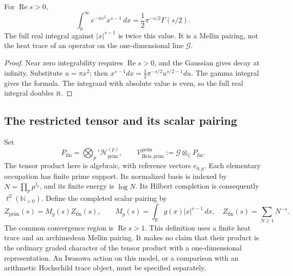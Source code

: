 \begin{proposition}
\label{v4-arith:prim-zeta:prop:arch-char}
For \(\operatorname{Re}s>0\),
\begin{equation}
\label{v4-arith:prim-zeta:eq:arch-char}
 \int_0^\infty e^{-\pi x^2}x^{s-1}\,dx
 =\frac12\pi^{-s/2}\Gamma(s/2).
\end{equation}
The full real integral against \(|x|^{s-1}\) is twice this value.
It is a Mellin pairing, not the heat trace of an operator on the
one-dimensional line \(\mathcal G\).
\end{proposition}
\begin{proof}
Near zero integrability requires \(\operatorname{Re}s>0\), and the
Gaussian gives decay at infinity. Substitute \(u=\pi x^2\); then
\(x^{s-1}dx=\frac12\pi^{-s/2}u^{s/2-1}du\).
The gamma integral gives the formula. The integrand with absolute
value is even, so the full real integral doubles it.
\end{proof}

\subsection{The restricted tensor and its scalar pairing}
\label{v4-arith:prim-zeta:adelic-primary}
\begin{definition}
\label{v4-arith:prim-zeta:def:primary-subspace}
Set
\begin{equation}
\label{v4-arith:prim-zeta:eq:adelic-primary}
 P_{\mathrm{fin}}=\bigotimes_p'\mathcal H^{(p)}_{\mathrm{prim}},\qquad
 \mathcal V^{\mathrm{prim}}_{\mathrm{Heis},\mathrm{prim}}
 :=\mathcal G\otimes_{\mathbb C}P_{\mathrm{fin}}.
\end{equation}
The tensor product here is algebraic, with reference vectors \(e_{0,p}\).
Each elementary occupation has finite prime support. Its normalized
basis is indexed by \(N=\prod_pp^{j_p}\), and its finite energy is
\(\log N\). Its Hilbert completion is consequently
\(\ell^2(\mathbb N_{>0})\). Define the completed scalar pairing by
\[
 Z_{\mathrm{prim}}(s)=M_g(s)Z_{\mathrm{fin}}(s),\qquad
 M_g(s)=\int_{\mathbb R}g(x)|x|^{s-1}\,dx,
 \quad Z_{\mathrm{fin}}(s)=\sum_{N\ge1}N^{-s}.
\]
The common convergence region is \(\operatorname{Re}s>1\).
This definition uses a finite heat trace and an archimedean Mellin
pairing. It makes no claim that their product is the ordinary graded
character of the tensor product with a one-dimensional representation.
An Iwasawa action on this model, or a comparison with an arithmetic
Hochschild trace object, must be specified separately.
\end{definition}

